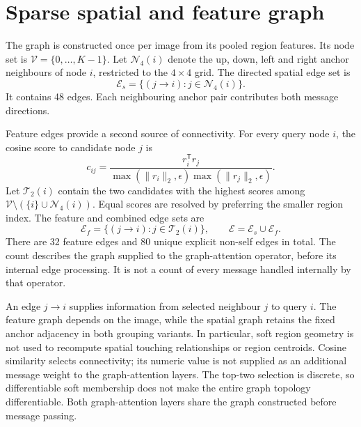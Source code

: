 \section{Sparse spatial and feature graph}

The graph is constructed once per image from its pooled region features.
Its node set is $\mathcal{V}=\{0,\ldots,K-1\}$. Let
$\mathcal{N}_{4}(i)$ denote the up, down, left and right anchor neighbours of
node $i$, restricted to the $4\times4$ grid. The directed spatial edge set is
\begin{equation}
 \mathcal{E}_{s}=\{(j\rightarrow i):j\in\mathcal{N}_{4}(i)\}.
 \label{eq:spatial-edges}
\end{equation}
It contains 48 edges. Each neighbouring anchor pair contributes both message
directions.

Feature edges provide a second source of connectivity. For every query node
$i$, the cosine score to candidate node $j$ is
\begin{equation}
 c_{ij}=\frac{r_i^{\mathsf T}r_j}
 {\max(\|r_i\|_2,\epsilon)\max(\|r_j\|_2,\epsilon)}.
 \label{eq:region-cosine}
\end{equation}
Let $\mathcal{T}_2(i)$ contain the two candidates with the highest scores
among $\mathcal{V}\setminus(\{i\}\cup\mathcal{N}_{4}(i))$. Equal scores
are resolved by preferring the smaller region index. The feature and combined
edge sets are
\begin{equation}
 \mathcal{E}_{f}=\{(j\rightarrow i):j\in\mathcal{T}_2(i)\},
 \qquad
 \mathcal{E}=\mathcal{E}_{s}\cup\mathcal{E}_{f}.
 \label{eq:feature-edges}
\end{equation}
There are 32 feature edges and 80 unique explicit non-self edges in total.
The count describes the graph supplied to the graph-attention operator,
before its internal edge processing. It is not a count of every message
handled internally by that operator.

An edge $j\rightarrow i$ supplies information from selected neighbour $j$ to
query $i$. The feature graph depends on the image, while the spatial graph
retains the fixed anchor adjacency in both grouping variants. In particular,
soft region geometry is not used to recompute spatial touching relationships
or region centroids. Cosine similarity selects connectivity; its numeric
value is not supplied as an additional message weight to the graph-attention
layers. The top-two selection is discrete, so differentiable soft membership
does not make the entire graph topology differentiable. Both graph-attention
layers share the graph constructed before message passing.

